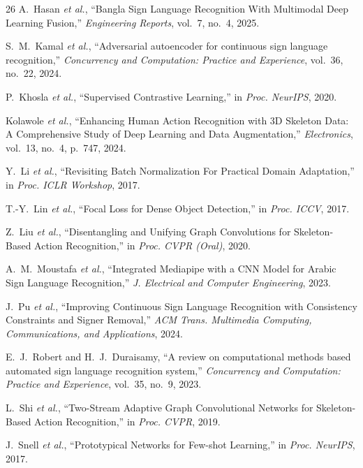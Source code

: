 \documentclass[conference]{IEEEtran}
\begin{document}
\begin{thebibliography}{26}
A.~Hasan \textit{et al.}, ``Bangla Sign Language Recognition With Multimodal Deep Learning Fusion,'' \textit{Engineering Reports}, vol.~7, no.~4, 2025.

S.~M.~Kamal \textit{et al.}, ``Adversarial autoencoder for continuous sign language recognition,'' \textit{Concurrency and Computation: Practice and Experience}, vol.~36, no.~22, 2024.

P.~Khosla \textit{et al.}, ``Supervised Contrastive Learning,'' in \textit{Proc. NeurIPS}, 2020.

Kolawole \textit{et al.}, ``Enhancing Human Action Recognition with 3D Skeleton Data: A Comprehensive Study of Deep Learning and Data Augmentation,'' \textit{Electronics}, vol.~13, no.~4, p.~747, 2024.

Y.~Li \textit{et al.}, ``Revisiting Batch Normalization For Practical Domain Adaptation,'' in \textit{Proc. ICLR Workshop}, 2017.

T.-Y.~Lin \textit{et al.}, ``Focal Loss for Dense Object Detection,'' in \textit{Proc. ICCV}, 2017.

Z.~Liu \textit{et al.}, ``Disentangling and Unifying Graph Convolutions for Skeleton-Based Action Recognition,'' in \textit{Proc. CVPR (Oral)}, 2020.

A.~M.~Moustafa \textit{et al.}, ``Integrated Mediapipe with a CNN Model for Arabic Sign Language Recognition,'' \textit{J. Electrical and Computer Engineering}, 2023.

J.~Pu \textit{et al.}, ``Improving Continuous Sign Language Recognition with Consistency Constraints and Signer Removal,'' \textit{ACM Trans. Multimedia Computing, Communications, and Applications}, 2024.

E.~J.~Robert and H.~J.~Duraisamy, ``A review on computational methods based automated sign language recognition system,'' \textit{Concurrency and Computation: Practice and Experience}, vol.~35, no.~9, 2023.

L.~Shi \textit{et al.}, ``Two-Stream Adaptive Graph Convolutional Networks for Skeleton-Based Action Recognition,'' in \textit{Proc. CVPR}, 2019.

J.~Snell \textit{et al.}, ``Prototypical Networks for Few-shot Learning,'' in \textit{Proc. NeurIPS}, 2017.


\end{thebibliography}
\end{document}
